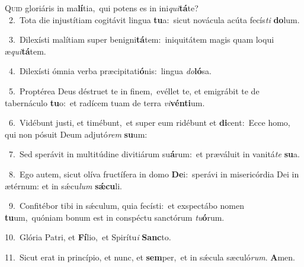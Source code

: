 \lettrine{\initial\textcolor{\initialcolor}{Q}}{uid} gloriáris in ma\-\textbf{lí}\-tia,~\star qui potens es in ini\-\textit{qui}\-\textbf{tá}te?\\
{\numbfont\textcolor{\numbcolor}{~2.}}~Tota die injustítiam cogitávit lingua \textbf{tu}\-a:~\star sicut novácula acúta fecís\textit{ti} \textbf{do}\-lum.\par
{\numbfont\textcolor{\numbcolor}{~3.}}~Dilexísti malítiam super benigni\-\textbf{tá}\-tem:~\star iniquitátem magis quam loqui æ\-\textit{qui}\-\textbf{tá}tem.\par
{\numbfont\textcolor{\numbcolor}{~4.}}~Dilexísti ómnia verba præcipitati\-\textbf{ó}\-nis:~\star lingua \textit{do}\-\textbf{ló}sa.\par
{\numbfont\textcolor{\numbcolor}{~5.}}~Proptérea Deus déstruet te in finem,~\dagger evéllet te, et emigrábit te de tabernáculo \textbf{tu}\-o:~\star et radícem tuam de terra \textit{vi}\-\textbf{vén}\textbf{ti}um.\par
{\numbfont\textcolor{\numbcolor}{~6.}}~Vidébunt justi, et timébunt,~\dagger et super eum ridébunt et \textbf{di}\-cent:~\star Ecce homo, qui non pósuit Deum adjutó\textit{rem} \textbf{su}\-um:\par
{\numbfont\textcolor{\numbcolor}{~7.}}~Sed sperávit in multitúdine divitiárum su\-\textbf{á}\-rum:~\star et præváluit in vanitá\textit{te} \textbf{su}\-a.\par
{\numbfont\textcolor{\numbcolor}{~8.}}~Ego autem, sicut olíva fructífera in domo \textbf{De}\-i:~\star sperávi in misericórdia Dei in ætérnum: et in sǽcu\textit{lum} \textbf{sǽ}\-\textbf{cu}li.\par
{\numbfont\textcolor{\numbcolor}{~9.}}~Confitébor tibi in sǽculum, quia fecísti:~\dagger et exspectábo nomen \textbf{tu}\-um,~\star quóniam bonum est in conspéctu sanctórum \textit{tu}\-\textbf{ó}rum.\par
{\numbfont\textcolor{\numbcolor}{10.}}~Glória Patri, et \textbf{Fí}\-lio,~\star et Spirítu\textit{i} \textbf{Sanc}\-to.\par
{\numbfont\textcolor{\numbcolor}{11.}}~Sicut erat in princípio, et nunc, et \textbf{sem}\-per,~\star et in sǽcula sæculó\-\textit{rum}\-. \textbf{A}\-men.\par
